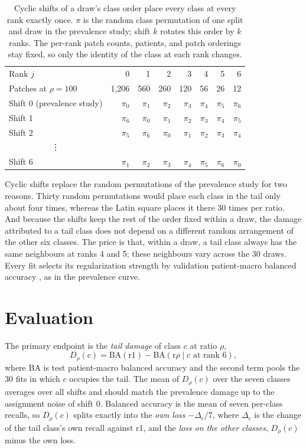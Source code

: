 \documentclass[11pt]{article}
\begin{document}
\begin{table}[htbp]
\centering
\renewcommand{\arraystretch}{1.15}
\begin{tabular}{@{}lrrrrrrr@{}}
\toprule
Rank $j$ & 0 & 1 & 2 & 3 & 4 & 5 & 6 \\
Patches at $\rho=100$ & 1,206 & 560 & 260 & 120 & 56 & 26 & 12 \\
\midrule
Shift 0 (prevalence study) & $\pi_0$ & $\pi_1$ & $\pi_2$ & $\pi_3$ & $\pi_4$ & $\pi_5$ & $\pi_6$ \\
Shift 1 & $\pi_6$ & $\pi_0$ & $\pi_1$ & $\pi_2$ & $\pi_3$ & $\pi_4$ & $\pi_5$ \\
Shift 2 & $\pi_5$ & $\pi_6$ & $\pi_0$ & $\pi_1$ & $\pi_2$ & $\pi_3$ & $\pi_4$ \\
\multicolumn{1}{c}{\vdots} & & & & & & & \\
Shift 6 & $\pi_1$ & $\pi_2$ & $\pi_3$ & $\pi_4$ & $\pi_5$ & $\pi_6$ & $\pi_0$ \\
\bottomrule
\end{tabular}
\caption{Cyclic shifts of a draw's class order place every class at every rank exactly once. $\pi$ is the random class permutation of one split and draw in the prevalence study; shift $k$ rotates this order by $k$ ranks. The per-rank patch counts, patients, and patch orderings stay fixed, so only the identity of the class at each rank changes.}
\label{tab:latin}
\end{table}

\noindent Cyclic shifts replace the random permutations of the prevalence study for two reasons. Thirty random permutations would place each class in the tail only about four times, whereas the Latin square places it there 30 times per ratio. And because the shifts keep the rest of the order fixed within a draw, the damage attributed to a tail class does not depend on a different random arrangement of the other six classes. The price is that, within a draw, a tail class always has the same neighbours at ranks 4 and 5; these neighbours vary across the 30 draws. Every fit selects its regularization strength by validation patient-macro balanced accuracy \citep{queisler2026patientShortage}, as in the prevalence curve.

\section{Evaluation}
\label{sec:evaluation}
The primary endpoint is the \emph{tail damage} of class $c$ at ratio $\rho$,
\begin{equation}
  D_\rho(c) = \mathrm{BA}(\text{r1}) - \mathrm{BA}(\text{r}\rho \mid c \text{ at rank } 6),
  \label{eq:tail-damage}
\end{equation}
\noindent where BA is test patient-macro balanced accuracy and the second term pools the 30 fits in which $c$ occupies the tail. The mean of $D_\rho(c)$ over the seven classes averages over all shifts and should match the prevalence damage up to the assignment noise of shift 0. Balanced accuracy is the mean of seven per-class recalls, so $D_\rho(c)$ splits exactly into the \emph{own loss} $-\Delta_c/7$, where $\Delta_c$ is the change of the tail class's own recall against r1, and the \emph{loss on the other classes}, $D_\rho(c)$ minus the own loss.
\end{document}
